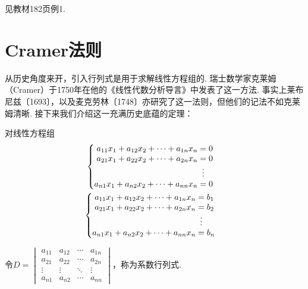 \begin{solution}
    见教材182页例1.
\end{solution}

\section{Cramer法则}

从历史角度来开，引入行列式是用于求解线性方程组的. 瑞士数学家克莱姆（Cramer）于1750年在他的《线性代数分析导言》中发表了这一方法. 事实上莱布尼兹〔1693〕，以及麦克劳林〔1748〕亦研究了这一法则，但他们的记法不如克莱姆清晰. 接下来我们介绍这一充满历史底蕴的定理：
\begin{theorem}[Cramer法则] \label{thm:13:Cramer} 
    对线性方程组
    \begin{gather}
        \label{eq:13:线性方程组1}
        \begin{cases} \begin{aligned}
                a_{11}x_1+a_{12}x_2+\cdots+a_{1n}x_n & = 0             \\
                a_{21}x_1+a_{22}x_2+\cdots+a_{2n}x_n & = 0             \\
                                                     & \vdotswithin{=} \\
                a_{n1}x_1+a_{n2}x_2+\cdots+a_{nn}x_n & = 0
            \end{aligned} \end{cases}
        \\
        \label{eq:13:线性方程组2}
        \begin{cases} \begin{aligned}
                a_{11}x_1+a_{12}x_2+\cdots+a_{1n}x_n & = b_1           \\
                a_{21}x_1+a_{22}x_2+\cdots+a_{2n}x_n & = b_2           \\
                                                     & \vdotswithin{=} \\
                a_{n1}x_1+a_{n2}x_2+\cdots+a_{nn}x_n & = b_n
            \end{aligned} \end{cases}
    \end{gather}

    令$D=\begin{vmatrix}
            a_{11} & a_{12} & \cdots & a_{1n} \\
            a_{21} & a_{22} & \cdots & a_{2n} \\
            \vdots & \vdots & \ddots & \vdots \\
            a_{n1} & a_{n2} & \cdots & a_{nn}
        \end{vmatrix}$，称为系数行列式.


\end{theorem}
